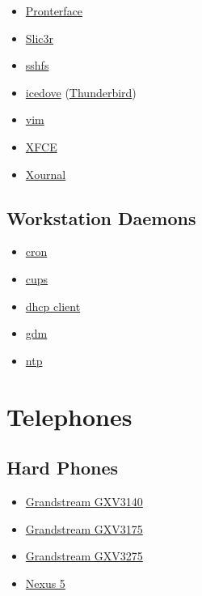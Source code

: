 \begin{itemize}
\item \href{https://github.com/kliment/Printrun}{Pronterface}
\item \href{http://slic3r.org/}{Slic3r}
\item \href{http://fuse.sourceforge.net/sshfs.html}{sshfs}
\item \href{https://wiki.debian.org/Icedove}{icedove} (\href{http://www.mozilla.org/en-US/thunderbird/}{Thunderbird})
\item \href{http://www.vim.org/}{vim}
\item \href{http://www.xfce.org/}{XFCE}
\item \href{http://xournal.sourceforge.net/}{Xournal}
\end{itemize}

\subsection{Workstation Daemons}
\begin{itemize}
\item \href{http://ftp.isc.org/isc/cron/}{cron}
\item \href{http://www.cups.org/}{cups}
\item \href{http://www.isc.org/}{dhcp client}
\item \href{https://wiki.gnome.org/Projects/GDM}{gdm}
\item \href{http://support.ntp.org/}{ntp}
\end{itemize}

\section{Telephones}
\subsection{Hard Phones}
\begin{itemize}
\item \href{https://www.grandstream.com/products/ip-video-telephony/gxv3140/}{Grandstream GXV3140}
\item \href{https://www.grandstream.com/products/ip-video-telephony/gxv3175/}{Grandstream GXV3175}
\item \href{https://www.grandstream.com/products/ip-video-telephony/gxv3275/}{Grandstream GXV3275}
\item \href{http://www.google.com/nexus/5/}{Nexus 5}
\end{itemize}

